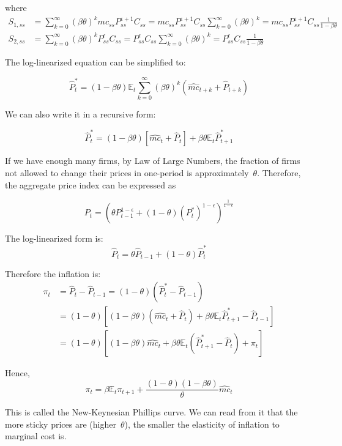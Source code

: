 \documentclass[10pt,a4]{article}
\begin{document}
where
\[
    \begin{aligned}
    S_{1,ss} &= \sum_{k=0}^{\infty} (\beta\theta)^k mc_{ss}P_{ss}^{\epsilon+1}C_{ss} = mc_{ss}P_{ss}^{\epsilon+1}C_{ss} \sum_{k=0}^{\infty} (\beta\theta)^k = mc_{ss}P_{ss}^{\epsilon+1}C_{ss} \frac{1}{1-\beta\theta}\\
    S_{2,ss} &= \sum_{k=0}^{\infty} (\beta\theta)^k P_{ss}^{\epsilon}C_{ss} = P_{ss}^{\epsilon}C_{ss} \sum_{k=0}^{\infty} (\beta\theta)^k = P_{ss}^{\epsilon}C_{ss} \frac{1}{1-\beta\theta} 
    \end{aligned}
\]

The log-linearized equation can be simplified to:

$$ \hat P_t^* = (1-\beta\theta)\mathbb{E}_t\sum_{k=0}^{\infty} (\beta\theta)^k (\hat{mc}_{t+k} + \hat P_{t+k}) $$

We can also write it in a recursive form:

$$ \hat P_t^* = (1-\beta\theta)[\hat{mc}_t + \hat P_t] + \beta\theta \mathbb{E}_t \hat P_{t+1}^* $$

\par\null

If we have enough many firms, by Law of Large Numbers, the fraction of
firms not allowed to change their prices in one-period is
approximately~\(\theta\). Therefore, the aggregate price index
can be expressed as

\par\null

$$ P_t = (\theta P_{t-1}^{1-\epsilon} + (1-\theta)(P_t^*)^{1-\epsilon})^{\frac{1}{1-\epsilon}}$$

The log-linearized form is:
$$ \hat P_t = \theta\hat P_{t-1} + (1-\theta)\hat P_t^* $$

Therefore the inflation is:
\[
\begin{aligned}
\pi_t &= \hat P_t - \hat P_{t-1} = (1-\theta)(\hat P_t^* - \hat P_{t-1}) \\
&= (1-\theta)\left[ (1-\beta\theta)(\hat{mc}_t + \hat P_t) + \beta\theta\mathbb{E}_t \hat P_{t+1}^* - \hat P_{t-1} \right] \\
&= (1-\theta)\left[ (1-\beta\theta)\hat{mc}_t + \beta\theta\mathbb{E}_t(\hat P_{t+1}^* - \hat P_t) + \pi_t \right]
\end{aligned}
\]

Hence, 
$$ \pi_t = \beta\mathbb{E}_t\pi_{t+1} + \frac{(1-\theta)(1-\beta\theta)}{\theta}\hat{mc}_t $$

This is called the New-Keynesian Phillips curve. We can read from it
that the more sticky prices are (higher~\(\theta\)), the smaller
the elasticity of inflation to marginal cost is.~~
\end{document}
